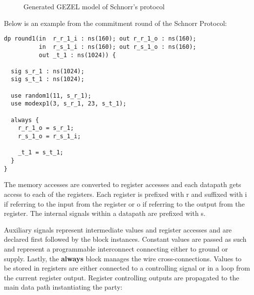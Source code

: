 \begin{figure}[hb!]
  \centering
  \caption{Generated GEZEL model of Schnorr's protocol}
  \label{fig:gezel_backend}
\end{figure}

Below is an example from the commitment round of the Schnorr Protocol:

\begin{lstlisting}[language=GEZEL]
dp round1(in  r_r_1_i : ns(160); out r_r_1_o : ns(160);
          in  r_s_1_i : ns(160); out r_s_1_o : ns(160);
          out _t_1 : ns(1024)) {
          
  sig s_r_1 : ns(1024);
  sig s_t_1 : ns(1024);

  use random1(11, s_r_1);
  use modexp1(3, s_r_1, 23, s_t_1);
  
  always {
    r_r_1_o = s_r_1;
    r_s_1_o = r_s_1_i;

    _t_1 = s_t_1;
  }
}
\end{lstlisting}

The memory accesses are converted to register accesses and each
datapath gets access to each of the registers. Each register is
prefixed with r and suffixed with i if referring to the input from the
register or o if referring to the output from the register. The
internal signals within a datapath are prefixed with s.

Auxiliary signals represent intermediate values and register accesses
and are declared first followed by the block instances. Constant
values are passed as such and represent a programmable interconnect
connecting either to ground or supply. Lastly, the \textbf{always}
block manages the wire cross-connections. Values to be stored in
registers are either connected to a controlling signal or in a loop
from the current register output. Register controlling outputs are
propagated to the main data path instantiating the party:

